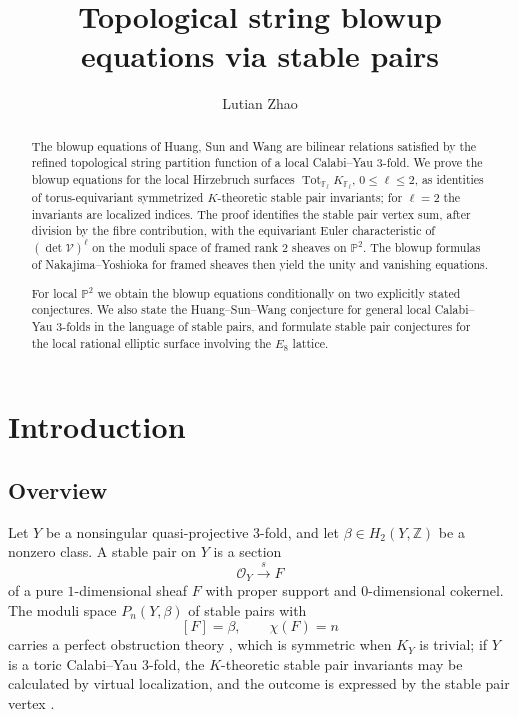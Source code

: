 \documentclass{amsart}
\title[Topological string blowup equations via stable pairs]{Topological string blowup equations via stable pairs}
\author{Lutian Zhao}
\date{}
\theoremstyle{definition}
\numberwithin{equation}{section}
\newcommand{\Z}{\mathbb Z}
\newcommand{\cO}{\mathcal O}
\begin{document}
\allowdisplaybreaks
\raggedbottom
\setlength{\emergencystretch}{2em}

\begin{abstract}
The blowup equations of Huang, Sun and Wang are bilinear relations satisfied by the refined topological string partition function of a local Calabi--Yau 3-fold.  We prove the blowup equations for the local Hirzebruch surfaces \(\operatorname{Tot}_{\mathbb F_\ell}K_{\mathbb F_\ell}\), \(0\leq\ell\leq2\), as identities of torus-equivariant symmetrized \(K\)-theoretic stable pair invariants; for \(\ell=2\) the invariants are localized indices.  The proof identifies the stable pair vertex sum, after division by the fibre contribution, with the equivariant Euler characteristic of \((\det\mathcal V)^\ell\) on the moduli space of framed rank \(2\) sheaves on \(\mathbb P^2\).  The blowup formulas of Nakajima--Yoshioka for framed sheaves then yield the unity and vanishing equations.

For local \(\mathbb P^2\) we obtain the blowup equations conditionally on two explicitly stated conjectures.  We also state the Huang--Sun--Wang conjecture for general local Calabi--Yau 3-folds in the language of stable pairs, and formulate stable pair conjectures for the local rational elliptic surface involving the \(E_8\) lattice.
\end{abstract}

\maketitle

\setcounter{tocdepth}{1}
\tableofcontents

\setcounter{section}{-1}
\section{Introduction}

\subsection{Overview}
Let \(Y\) be a nonsingular quasi-projective 3-fold, and let \(\beta\in H_2(Y,\Z)\) be a nonzero class.  A stable pair on \(Y\) is a section
\[
 \cO_Y\xrightarrow{s}F
\]
of a pure \(1\)-dimensional sheaf \(F\) with proper support and \(0\)-dimensional cokernel.  The moduli space \(P_n(Y,\beta)\) of stable pairs with
\[
 [F]=\beta,\qquad \chi(F)=n
\]
carries a perfect obstruction theory \cite{PandharipandeThomasStablePairs}, which is symmetric when \(K_Y\) is trivial; if \(Y\) is a toric Calabi--Yau 3-fold, the \(K\)-theoretic stable pair invariants may be calculated by virtual localization, and the outcome is expressed by the stable pair vertex \cite{PandharipandeThomasVertex,KuhnLiuThimm}.
\end{document}
